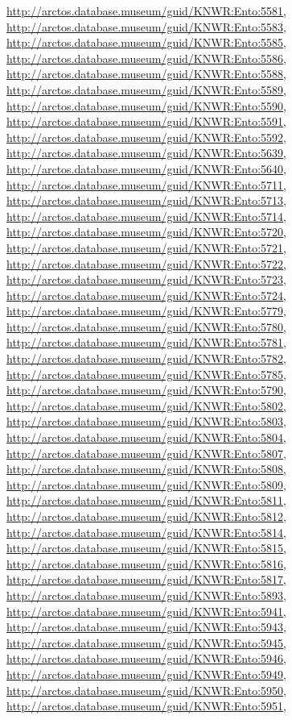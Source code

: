 \documentclass[9pt, article]{memoir}
\begin{document}
\begin{multicols}{2}
\url{http://arctos.database.museum/guid/KNWR:Ento:5581}, 
\url{http://arctos.database.museum/guid/KNWR:Ento:5583}, 
\url{http://arctos.database.museum/guid/KNWR:Ento:5585}, 
\url{http://arctos.database.museum/guid/KNWR:Ento:5586}, 
\url{http://arctos.database.museum/guid/KNWR:Ento:5588}, 
\url{http://arctos.database.museum/guid/KNWR:Ento:5589}, 
\url{http://arctos.database.museum/guid/KNWR:Ento:5590}, 
\url{http://arctos.database.museum/guid/KNWR:Ento:5591}, 
\url{http://arctos.database.museum/guid/KNWR:Ento:5592}, 
\url{http://arctos.database.museum/guid/KNWR:Ento:5639}, 
\url{http://arctos.database.museum/guid/KNWR:Ento:5640}, 
\url{http://arctos.database.museum/guid/KNWR:Ento:5711}, 
\url{http://arctos.database.museum/guid/KNWR:Ento:5713}, 
\url{http://arctos.database.museum/guid/KNWR:Ento:5714}, 
\url{http://arctos.database.museum/guid/KNWR:Ento:5720}, 
\url{http://arctos.database.museum/guid/KNWR:Ento:5721}, 
\url{http://arctos.database.museum/guid/KNWR:Ento:5722}, 
\url{http://arctos.database.museum/guid/KNWR:Ento:5723}, 
\url{http://arctos.database.museum/guid/KNWR:Ento:5724}, 
\url{http://arctos.database.museum/guid/KNWR:Ento:5779}, 
\url{http://arctos.database.museum/guid/KNWR:Ento:5780}, 
\url{http://arctos.database.museum/guid/KNWR:Ento:5781}, 
\url{http://arctos.database.museum/guid/KNWR:Ento:5782}, 
\url{http://arctos.database.museum/guid/KNWR:Ento:5785}, 
\url{http://arctos.database.museum/guid/KNWR:Ento:5790}, 
\url{http://arctos.database.museum/guid/KNWR:Ento:5802}, 
\url{http://arctos.database.museum/guid/KNWR:Ento:5803}, 
\url{http://arctos.database.museum/guid/KNWR:Ento:5804}, 
\url{http://arctos.database.museum/guid/KNWR:Ento:5807}, 
\url{http://arctos.database.museum/guid/KNWR:Ento:5808}, 
\url{http://arctos.database.museum/guid/KNWR:Ento:5809}, 
\url{http://arctos.database.museum/guid/KNWR:Ento:5811}, 
\url{http://arctos.database.museum/guid/KNWR:Ento:5812}, 
\url{http://arctos.database.museum/guid/KNWR:Ento:5814}, 
\url{http://arctos.database.museum/guid/KNWR:Ento:5815}, 
\url{http://arctos.database.museum/guid/KNWR:Ento:5816}, 
\url{http://arctos.database.museum/guid/KNWR:Ento:5817}, 
\url{http://arctos.database.museum/guid/KNWR:Ento:5893}, 
\url{http://arctos.database.museum/guid/KNWR:Ento:5941}, 
\url{http://arctos.database.museum/guid/KNWR:Ento:5943}, 
\url{http://arctos.database.museum/guid/KNWR:Ento:5945}, 
\url{http://arctos.database.museum/guid/KNWR:Ento:5946}, 
\url{http://arctos.database.museum/guid/KNWR:Ento:5949}, 
\url{http://arctos.database.museum/guid/KNWR:Ento:5950}, 
\url{http://arctos.database.museum/guid/KNWR:Ento:5951}, 

\end{multicols}
\end{document}
